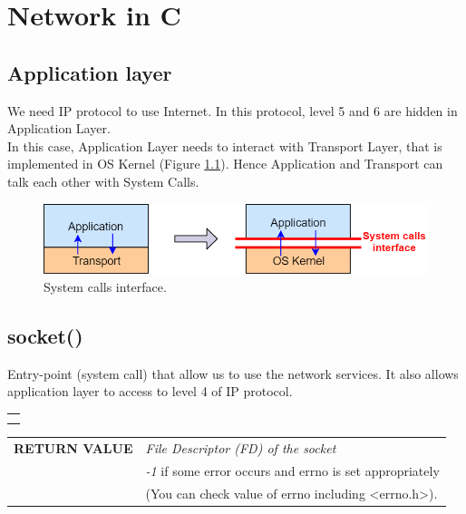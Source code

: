 \chapter{Network in C}\label{networkC}
\section{Application layer}
We need IP protocol to use Internet. In this protocol, level 5 and 6 are hidden in Application Layer.\\
In this case, Application Layer needs to interact with Transport Layer, that is implemented in OS Kernel (Figure \ref{app_kernel}). Hence Application and Transport can talk each other with System Calls.
\begin{figure}[H]
\centering
\includegraphics[scale=0.5]{Images/NetworkC/application}\caption{\footnotesize{System calls interface.}}\label{app_kernel}
\end{figure}

\section{socket()}\label{socket}
Entry-point (system call) that allow us to use the network services. It also allows application layer to access to level 4 of IP protocol. 
\begin{center}
\begin{tabular}{c}
\begin{lstlisting}[linewidth=270pt, basicstyle=\footnotesize\sffamily,]
#include <sys/types.h>
#include <sys/socket.h>

int socket(int domain, int type, int protocol);\\
\end{lstlisting}
\end{tabular}
\end{center}

\begin{table}[h]
\centering
\begin{tabular}{rcl}
\textbf{RETURN VALUE} & \multicolumn{2}{l}{\textit{File Descriptor (FD) of the socket} }\\
{} & \multicolumn{2}{l}{\textit{-1} if some error occurs and errno is set appropriately}\\
{} & \multicolumn{2}{l}{(You can check value of errno including <errno.h>).}\\
\end{tabular}
\end{table}

